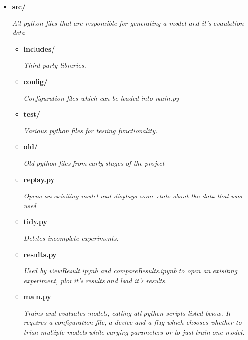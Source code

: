   {\small
    \begin{itemize}
      \item   {\bf src/}
              \begin{sloppypar} \textit{All python files that are responsible for generating a model and it's evaulation data}\end{sloppypar}
              \begin{itemize}
                \item {\bf includes/ }
                \begin{sloppypar} \textit{Third party libraries.}\end{sloppypar}
                \item {\bf config/ }
                \begin{sloppypar} \textit{Configuration files which can be loaded into main.py}\end{sloppypar}
                \item {\bf test/ }
                \begin{sloppypar} \textit{Various python files for testing functionality.}\end{sloppypar}
                \item {\bf old/ }
                \begin{sloppypar} \textit{Old python files from early stages of the project}\end{sloppypar}
                \item {\bf replay.py }
                \begin{sloppypar} \textit{Opens an exisiting model and displays some stats about the data that was used}\end{sloppypar}
                \item {\bf tidy.py }
                \begin{sloppypar} \textit{Deletes incomplete experiments.}\end{sloppypar}
                \item {\bf results.py }
                \begin{sloppypar} \textit{Used by viewResult.ipynb and compareResults.ipynb to open an exisiting experiment, plot it's results and load it's results.}\end{sloppypar}
                \item {\bf main.py }
                \begin{sloppypar} \textit{Trains and evaluates models, calling all python scripts listed below. It requires a configuration file, a device and a flag which chooses whether to trian multiple models while varying parameters or to just train one model.}\end{sloppypar}

\end{itemize}
\end{itemize}}
